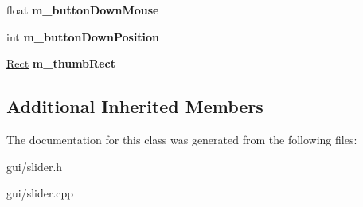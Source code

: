 \begin{DoxyCompactItemize}
\item 
float {\bfseries m\+\_\+button\+Down\+Mouse}\hypertarget{classSlider_aa712f7ac2214374d785cb9eae8e504fd}{}\label{classSlider_aa712f7ac2214374d785cb9eae8e504fd}

\item 
int {\bfseries m\+\_\+button\+Down\+Position}\hypertarget{classSlider_ace7e45ee45536e951c6ce0709e86a265}{}\label{classSlider_ace7e45ee45536e951c6ce0709e86a265}

\item 
\hyperlink{classRect}{Rect} {\bfseries m\+\_\+thumb\+Rect}\hypertarget{classSlider_a1032dd42016d750527ac1d97e161e35d}{}\label{classSlider_a1032dd42016d750527ac1d97e161e35d}

\end{DoxyCompactItemize}
\subsection*{Additional Inherited Members}


The documentation for this class was generated from the following files\+:\begin{DoxyCompactItemize}
\item 
gui/slider.\+h\item 
gui/slider.\+cpp\end{DoxyCompactItemize}
